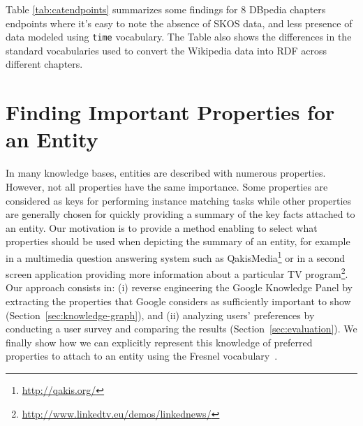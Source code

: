 \begin{table}[ht!]
\end{table}

Table \ref{tab:catendpoints} summarizes some findings for $8$ DBpedia chapters endpoints where it's easy to note the absence of SKOS data, and less presence of data modeled using \texttt{time} vocabulary. The Table also shows the differences in the standard vocabularies used to convert the Wikipedia data into RDF across different chapters.

\section{Finding Important Properties for an Entity}
\label{sec:propEntities}
In many knowledge bases, entities are described with numerous properties. However, not all properties have the same importance. Some properties are considered as keys for performing instance matching tasks while other properties are generally chosen for quickly providing a summary of the key facts attached to an entity. Our motivation is to provide a method enabling to select what properties should be used when depicting the summary of an entity, for example in a multimedia question answering system such as QakisMedia\footnote{\url{http://qakis.org/}} or in a second screen application providing more information about a particular TV program\footnote{\url{http://www.linkedtv.eu/demos/linkednews/}}. Our approach consists in: (i) reverse engineering the Google Knowledge Panel by extracting the properties that Google considers as sufficiently important to show (Section~\ref{sec:knowledge-graph}), and (ii) analyzing users' preferences by conducting a user survey and comparing the results (Section~\ref{sec:evaluation}). We finally show how we can explicitly represent this knowledge of preferred properties to attach to an entity using the Fresnel vocabulary~\cite{pietriga2006}. \\

